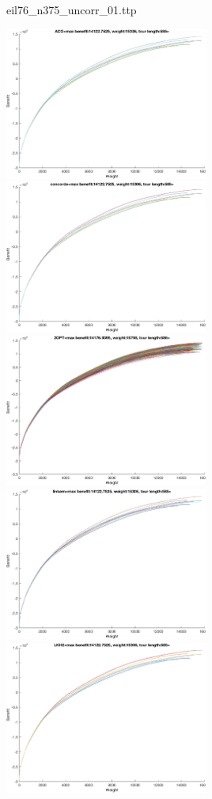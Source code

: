 \documentclass{article}
\begin{document}
\newpage
eil76\_n375\_uncorr\_01.ttp

\noindent
\includegraphics[width=0.5\textwidth]{eil76figs/eil76_n375_uncorr_01.ttp.aco.txt.eps}
\includegraphics[width=0.5\textwidth]{eil76figs/eil76_n375_uncorr_01.ttp.con.txt.eps}
\includegraphics[width=0.5\textwidth]{eil76figs/eil76_n375_uncorr_01.ttp.inv.txt.eps}
\includegraphics[width=0.5\textwidth]{eil76figs/eil76_n375_uncorr_01.ttp.lkh.txt.eps}
\includegraphics[width=0.5\textwidth]{eil76figs/eil76_n375_uncorr_01.ttp.lkh2.txt.eps}
\end{document}
